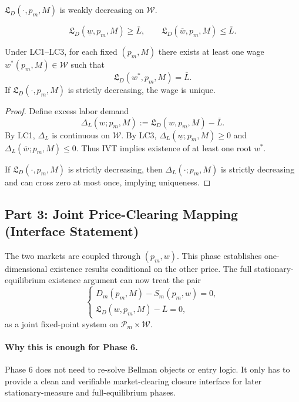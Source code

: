 \begin{assumption}
$\mathfrak L_D(\cdot,p_m,M)$ is weakly decreasing on $\mathcal W$.
\end{assumption}

\begin{assumption}
\[
\mathfrak L_D(\underline w,p_m,M)\ge \bar L,
\qquad
\mathfrak L_D(\overline w,p_m,M)\le \bar L.
\]
\end{assumption}

\begin{proposition}
Under LC1--LC3, for each fixed $(p_m,M)$ there exists at least one wage $w^*(p_m,M)\in\mathcal W$ such that
\[
\mathfrak L_D(w^*,p_m,M)=\bar L.
\]
If $\mathfrak L_D(\cdot,p_m,M)$ is strictly decreasing, the wage is unique.
\end{proposition}

\begin{proof}
Define excess labor demand
\[
\Delta_L(w;p_m,M):=\mathfrak L_D(w,p_m,M)-\bar L.
\]
By LC1, $\Delta_L$ is continuous on $\mathcal W$. By LC3, $\Delta_L(\underline w;p_m,M)\ge 0$ and $\Delta_L(\overline w;p_m,M)\le 0$. Thus IVT implies existence of at least one root $w^*$.

If $\mathfrak L_D(\cdot,p_m,M)$ is strictly decreasing, then $\Delta_L(\cdot;p_m,M)$ is strictly decreasing and can cross zero at most once, implying uniqueness.
\end{proof}

\subsection{Part 3: Joint Price-Clearing Mapping (Interface Statement)}

The two markets are coupled through $(p_m,w)$. This phase establishes one-dimensional existence results conditional on the other price. The full stationary-equilibrium existence argument can now treat the pair
\[
\begin{cases}
D_m(p_m,M)-S_m(p_m,w)=0,\\
\mathfrak L_D(w,p_m,M)-\bar L=0,
\end{cases}
\]
as a joint fixed-point system on $\mathcal P_m\times\mathcal W$.

\paragraph{Why this is enough for Phase 6.}
Phase 6 does not need to re-solve Bellman objects or entry logic. It only has to provide a clean and verifiable market-clearing closure interface for later stationary-measure and full-equilibrium phases.

